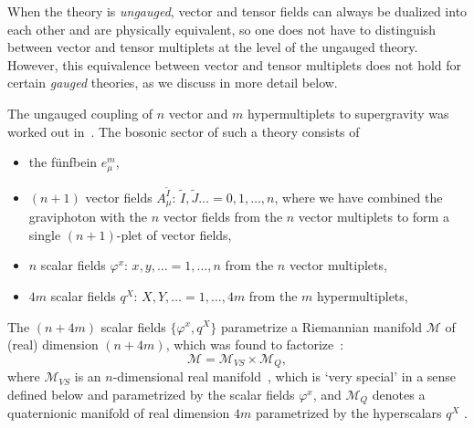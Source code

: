 \documentclass[a4paper,11pt]{article}
\begin{document}
When the theory is \emph{ungauged}, vector and tensor fields can always be
dualized into each other and are physically equivalent, so one does not
have to distinguish between vector and tensor multiplets at the level of
the ungauged theory. However, this equivalence between vector and tensor
multiplets does not hold for certain \emph{gauged} theories, as we discuss
in more detail below. 

The ungauged coupling of $n$ vector and $m$ hypermultiplets to
supergravity was worked out in~\cite{GST1,Sier}. The bosonic
sector of such a theory consists of
\begin{itemize}
\item the f\"{u}nfbein $e_{\mu}^m$,
\item $(n+1)$ vector fields $A_{\mu}^{\tilde{I}}$:
$\tilde{I},\tilde{J}\ldots=0,1,\ldots,n$, where we have combined
the graviphoton with the $n$ vector fields from the $n$ vector
multiplets to form a single $(n+1)$-plet of vector fields,
\item $n$ scalar fields $\varphi^{x}$: $x,y,\ldots=1,\ldots, n$
from the $n$ vector multiplets,
\item $4m$ scalar fields $q^X$: $X,Y,\ldots=1,\ldots,4m$ from the
$m$ hypermultiplets,
\end{itemize}
The $(n+4m)$ scalar fields $\{\varphi^x,q^X\}$ parametrize a
Riemannian manifold $\mathcal{M}$ of (real) dimension $(n+4m)$,
which was found to factorize~\cite{Sier}:
\begin{equation}
\mathcal{M}=\mathcal{M}_{VS}\times \mathcal{M}_Q,
\end{equation}
where $\mathcal{M}_{VS}$ is an $n$-dimensional real manifold~\cite{GST1},
which is `very special' in a sense defined below and parametrized by the
scalar fields $\varphi^x$, and $\mathcal{M}_Q$ denotes a quaternionic
manifold of real dimension $4m$ parametrized by the hyperscalars $q^X$
\cite{bagwit}.
\end{document}
